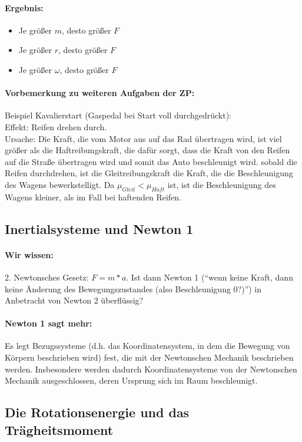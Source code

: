 	\paragraph{Ergebnis:}
	\begin{itemize}
		\item Je größer $ m $, desto größer $ F $
		\item Je größer $ r $, desto größer $ F $
		\item Je größer $ \omega $, desto größer $ F $
	\end{itemize}
	\paragraph{Vorbemerkung zu weiteren Aufgaben der ZP:}
	Beispiel Kavalierstart (Gaspedal bei Start voll durchgedrückt):\\
	Effekt: Reifen drehen durch.\\
	Ursache: Die Kraft, die vom Motor aus auf das Rad übertragen wird, ist viel größer als die Haftreibungskraft, die dafür sorgt, dass die Kraft von den Reifen auf die Straße übertragen wird und somit das Auto beschleunigt wird. sobald die Reifen durchdrehen, ist die Gleitreibungskraft die Kraft, die die Beschleunigung des Wagens bewerkstelligt. Da $ \mu_{Gleit} < \mu_{Haft} $ ist, ist die Beschleunigung des Wagens kleiner, als im Fall bei haftenden Reifen.
	
	\subsection{Inertialsysteme und Newton 1}
	\paragraph{Wir wissen:}
	2. Newtonsches Gesetz: $ F = m*a $. Ist dann Newton 1 (``wenn keine Kraft, dann keine Änderung des Bewegungszustandes (also Beschleunigung 0?)'') in Anbetracht von Newton 2 überflüssig?
	\paragraph{Newton 1 sagt mehr:} Es legt Bezugssysteme (d.h. das Koordinatensystem, in dem die Bewegung von Körpern beschrieben wird) fest, die mit der Newtonschen Mechanik beschrieben werden. Insbesondere werden dadurch Koordinatensysteme von der Newtonschen Mechanik ausgeschlossen, deren Ursprung sich im Raum beschleunigt.
	
	\subsection{Die Rotationsenergie und das Trägheitsmoment}
